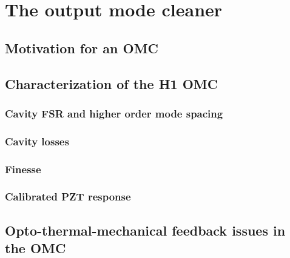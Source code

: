 \chapter{The output mode cleaner}

\section{Motivation for an OMC}

\section{Characterization of the H1 OMC}

\subsection{Cavity FSR and higher order mode spacing}

\subsection{Cavity losses}

\subsection{Finesse}

\subsection{Calibrated PZT response}


\section{Opto-thermal-mechanical feedback issues in the OMC}


